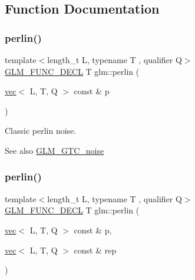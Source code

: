 \subsection{Function Documentation}
\mbox{\label{group__gtc__noise_ga1e043ce3b51510e9bc4469227cefc38a}} 
\subsubsection{\texorpdfstring{perlin()}{perlin()}\hspace{0.1cm}{\footnotesize\ttfamily [1/2]}}
{\footnotesize\ttfamily template$<$length\+\_\+t L, typename T , qualifier Q$>$ \\
\hyperlink{setup_8hpp_ab2d052de21a70539923e9bcbf6e83a51}{G\+L\+M\+\_\+\+F\+U\+N\+C\+\_\+\+D\+E\+CL} T glm\+::perlin (\begin{DoxyParamCaption}\item[{\hyperlink{structglm_1_1vec}{vec}$<$ L, T, Q $>$ const \&}]{p }\end{DoxyParamCaption})}

Classic perlin noise. \begin{DoxySeeAlso}{See also}
\hyperlink{group__gtc__noise}{G\+L\+M\+\_\+\+G\+T\+C\+\_\+noise} 
\end{DoxySeeAlso}
\mbox{\label{group__gtc__noise_gac270edc54c5fc52f5985a45f940bb103}} 
\subsubsection{\texorpdfstring{perlin()}{perlin()}\hspace{0.1cm}{\footnotesize\ttfamily [2/2]}}
{\footnotesize\ttfamily template$<$length\+\_\+t L, typename T , qualifier Q$>$ \\
\hyperlink{setup_8hpp_ab2d052de21a70539923e9bcbf6e83a51}{G\+L\+M\+\_\+\+F\+U\+N\+C\+\_\+\+D\+E\+CL} T glm\+::perlin (\begin{DoxyParamCaption}\item[{\hyperlink{structglm_1_1vec}{vec}$<$ L, T, Q $>$ const \&}]{p,  }\item[{\hyperlink{structglm_1_1vec}{vec}$<$ L, T, Q $>$ const \&}]{rep }\end{DoxyParamCaption})}

